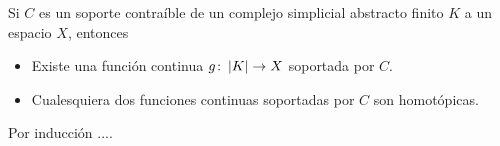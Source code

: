 \begin{Teo}
Si $C$ es un soporte contraíble de un complejo simplicial abstracto finito $K$ a un espacio $X$, entonces
\begin{itemize}
\item Existe una función continua $g\colon \left| K \right|\rightarrow X$ soportada por $C$.
\item Cualesquiera dos funciones continuas soportadas por $C$ son homotópicas.
\end{itemize}
\end{Teo}
\begin{Dem}

Por inducción ....
\end{Dem}
